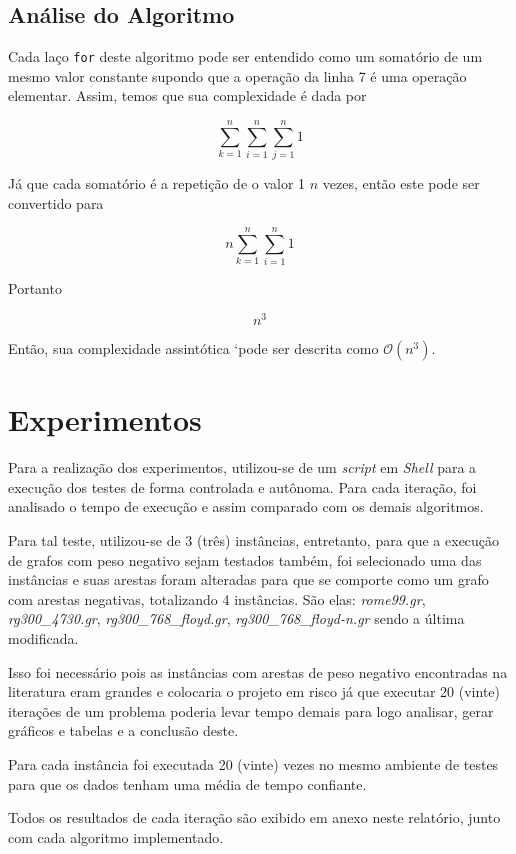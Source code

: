 \documentclass[12pt]{article}
\begin{document}
\subsection{Análise do Algoritmo}

Cada laço \texttt{for} deste algoritmo pode ser entendido como um somatório de um mesmo valor constante supondo que a operação da linha 7 é uma operação elementar. Assim, temos que sua complexidade é dada por

    $$\sum_{k=1}^{n}\sum_{i=1}^{n}\sum_{j=1}^{n}1$$
    
Já que cada somatório é a repetição de o valor 1 $n$ vezes, então este pode ser convertido para

$$n\sum_{k=1}^{n}\sum_{i=1}^{n}1$$

Portanto

$$n^3$$

Então, sua complexidade assintótica `pode ser descrita como $\mathcal{O}(n^3)$.



\section{Experimentos}

Para a realização dos experimentos, utilizou-se de um \textit{script} em \textit{Shell} para a execução dos testes de forma controlada e autônoma. Para cada iteração, foi analisado o tempo de execução e assim comparado com os demais algoritmos.

Para tal teste, utilizou-se de 3 (três) instâncias, entretanto, para que a execução de grafos com peso negativo sejam testados também, foi selecionado uma das instâncias e suas arestas foram alteradas para que se comporte como um grafo com arestas negativas, totalizando 4 instâncias. São elas: \textit{rome99.gr}, \textit{rg300\_4730.gr}, \textit{rg300\_768\_floyd.gr}, \textit{rg300\_768\_floyd-n.gr} sendo a última modificada.

Isso foi necessário pois as instâncias com arestas de peso negativo encontradas na literatura eram grandes e colocaria o projeto em risco já que executar 20 (vinte) iterações de um problema poderia levar tempo demais para logo analisar, gerar gráficos e tabelas e a conclusão deste.

Para cada instância foi executada 20 (vinte) vezes no mesmo ambiente de testes para que os dados tenham uma média de tempo confiante.

Todos os resultados de cada iteração são exibido em anexo neste relatório, junto com cada algoritmo implementado.
\end{document}
